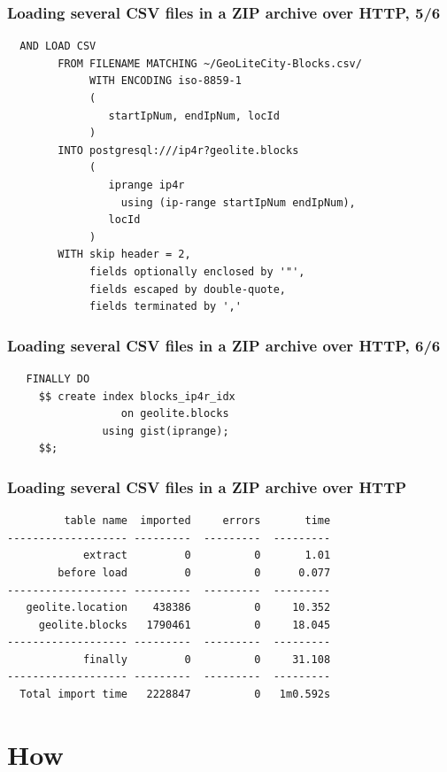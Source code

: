 \documentclass{beamer}
\begin{document}
\begin{frame}[fragile]
  \frametitle{Loading several CSV files in a ZIP archive over HTTP, 5/6}
  
\begin{verbatim}
  AND LOAD CSV
        FROM FILENAME MATCHING ~/GeoLiteCity-Blocks.csv/
             WITH ENCODING iso-8859-1
             (
                startIpNum, endIpNum, locId
             )
        INTO postgresql:///ip4r?geolite.blocks
             (
                iprange ip4r
                  using (ip-range startIpNum endIpNum),
                locId
             )
        WITH skip header = 2,
             fields optionally enclosed by '"',
             fields escaped by double-quote,
             fields terminated by ','
\end{verbatim}
\end{frame}

\begin{frame}[fragile]
  \frametitle{Loading several CSV files in a ZIP archive over HTTP, 6/6}
  
\begin{verbatim}
   FINALLY DO
     $$ create index blocks_ip4r_idx
                  on geolite.blocks
               using gist(iprange);
     $$;
\end{verbatim}
\end{frame}

\begin{frame}[fragile]
  \frametitle{Loading several CSV files in a ZIP archive over HTTP}

  
\begin{verbatim}
         table name  imported     errors       time
------------------- ---------  ---------  ---------
            extract         0          0       1.01
        before load         0          0      0.077
------------------- ---------  ---------  ---------
   geolite.location    438386          0     10.352
     geolite.blocks   1790461          0     18.045
------------------- ---------  ---------  ---------
            finally         0          0     31.108
------------------- ---------  ---------  ---------
  Total import time   2228847          0   1m0.592s
\end{verbatim}
\end{frame}

\section{How}
\end{document}

